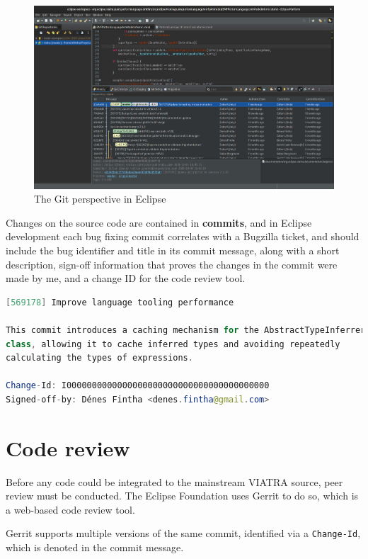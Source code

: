 \documentclass[11pt,a4paper,oneside]{report}
\begin{document}
\begin{figure}[ht]
\centering
\includegraphics[width=150mm, keepaspectratio]{figures/eclipse-git.png}
\caption{The Git perspective in Eclipse}
\label{fig:eclipse-git}
\end{figure}

Changes on the source code are contained in \textbf{commits}, and in Eclipse
development each bug fixing commit correlates with a Bugzilla ticket, and
should include the bug identifier and title in its commit message, along with
a short description, sign-off information that proves the changes in the commit
were made by me, and a change ID for the code review tool.

\begin{lstlisting}[caption={The contents of my commit message}, language=java]
[569178] Improve language tooling performance

This commit introduces a caching mechanism for the AbstractTypeInferrer
class, allowing it to cache inferred types and avoiding repeatedly
calculating the types of expressions.

Change-Id: I0000000000000000000000000000000000000000
Signed-off-by: Dénes Fintha <denes.fintha@gmail.com>
\end{lstlisting}

\section{Code review}
Before any code could be integrated to the mainstream VIATRA source, peer review
must be conducted. The Eclipse Foundation uses Gerrit to do so, which is a
web-based code review tool.

Gerrit supports multiple versions of the same commit, identified via a
\texttt{Change-Id}, which is denoted in the commit message.
\end{document}
